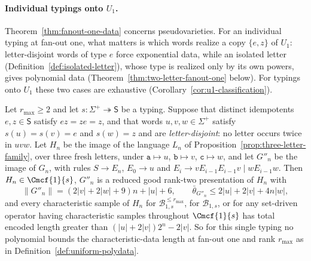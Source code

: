 
\paragraph{Individual typings onto $U_1$.}
Theorem~\ref{thm:fanout-one-data} concerns pseudovarieties.  For an
individual typing at fan-out one, what matters is which words realize a copy
$\{e,z\}$ of $U_1$: letter-disjoint words of type $e$ force exponential data,
while an isolated letter (Definition~\ref{def:isolated-letter}), whose type is
realized only by its own powers, gives polynomial data
(Theorem~\ref{thm:two-letter-fanout-one} below).  For typings onto $U_1$
these two cases are exhaustive (Corollary~\ref{cor:u1-classification}).

\begin{corollary}
\label{cor:typing-level-obstruction}
Let $r_{\max}\ge2$ and let $s:\Sigma^+\twoheadrightarrow\mathsf S$ be a typing.
Suppose that distinct idempotents $e,z\in\mathsf S$ satisfy $ez=ze=z$, and that
words $u,v,w\in\Sigma^+$ satisfy $s(u)=s(v)=e$ and $s(w)=z$ and are
\emph{letter-disjoint}: no letter occurs twice in $uvw$.  Let $H_n$ be the image
of the language $L_n$ of Proposition~\ref{prop:three-letter-family}, over three
fresh letters, under $\mathtt a\mapsto u$, $\mathtt b\mapsto v$, $\mathtt c\mapsto w$,
and let $G''_n$ be the image of $G_n$, with rules $S\to E_n$, $E_0\to u$ and
$E_i\to vE_{i-1}E_{i-1}v\mid wE_{i-1}w$.  Then $H_n\in\Cmcf{1}{s}$, $G''_n$ is a
reduced good rank-two presentation of $H_n$ with
\[
 \|G''_n\|=(2|v|+2|w|+9)n+|u|+6,\qquad
 \bar\theta_{G''_n}\le2|u|+2|v|+4n|w|,
\]
and every characteristic sample of $H_n$ for $\mathcal B^{\le r_{\max}}_{1,s}$,
for $\mathcal B_{1,s}$, or for any set-driven operator having characteristic
samples throughout $\Cmcf{1}{s}$ has total encoded length greater than
$(|u|+2|v|)2^n-2|v|$.  So for this single typing no polynomial bounds the
characteristic-data length at fan-out one and rank $r_{\max}$ as in
Definition~\ref{def:uniform-polydata}.
\end{corollary}

